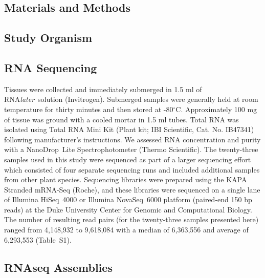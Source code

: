 \documentclass[11pt,letterpaper,titlepage]{article}
\begin{document}
\begin{linenumbers}
\section*{Materials and Methods}

\subsection*{Study Organism}

\subsection*{RNA Sequencing}

Tissues were collected and immediately submerged in 1.5 ml of RNA\textit{later}\texttrademark~solution (Invitrogen).
Submerged samples were generally held at room temperature for thirty minutes and then stored at -80$^{\circ}$C.
Approximately 100 mg of tissue was ground with a cooled mortar in 1.5 ml tubes.
Total RNA was isolated using Total RNA Mini Kit (Plant kit; IBI Scientific, Cat. No. IB47341) following manufacturer's instructions.
We assessed RNA concentration and purity with a NanoDrop\texttrademark~Lite Spectrophotometer (Thermo Scientific).
The twenty-three samples used in this study were sequenced as part of a larger sequencing effort which consisted of four separate sequencing runs and included additional samples from other plant species.
Sequencing libraries were prepared using the KAPA Stranded mRNA-Seq (Roche), and these libraries were sequenced on a single lane of Illumina \mbox{HiSeq}~4000 or Illumina \mbox{NovaSeq}~6000 platform (paired-end 150 bp reads) at the Duke University Center for Genomic and Computational Biology.
The number of resulting read pairs (for the twenty-three samples presented here) ranged from 4,148,932 to 9,618,084 with a median of 6,363,556 and average of 6,293,553 (Table~S1).

\subsection*{RNAseq Assemblies}


\end{linenumbers}
\end{document}
